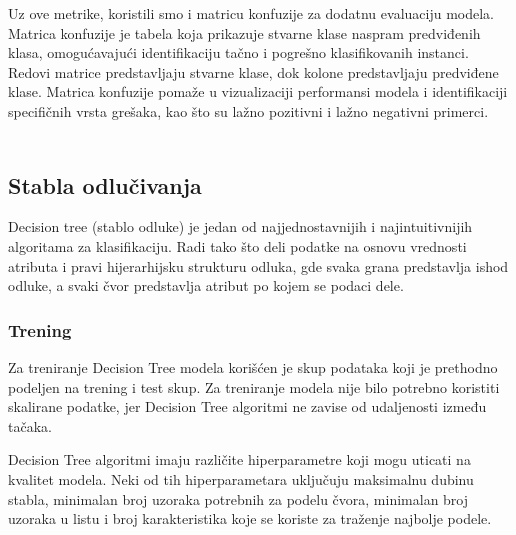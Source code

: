\documentclass[a4paper,12pt]{article}
\begin{document}
Uz ove metrike, koristili smo i matricu konfuzije za dodatnu evaluaciju modela. Matrica konfuzije je tabela koja prikazuje stvarne klase naspram predviđenih klasa, omogućavajući identifikaciju tačno i pogrešno klasifikovanih instanci. Redovi matrice predstavljaju stvarne klase, dok kolone predstavljaju predviđene klase. Matrica konfuzije pomaže u vizualizaciji performansi modela i identifikaciji specifičnih vrsta grešaka, kao što su lažno pozitivni i lažno negativni primerci.\\\\


\subsection{Stabla odlučivanja}
Decision tree (stablo odluke) je jedan od najjednostavnijih i najintuitivnijih algoritama za klasifikaciju. Radi tako što deli podatke na osnovu vrednosti atributa i pravi hijerarhijsku strukturu odluka, gde svaka grana predstavlja ishod odluke, a svaki čvor predstavlja atribut po kojem se podaci dele.


\subsubsection{Trening}

Za treniranje Decision Tree modela korišćen je skup podataka koji je prethodno podeljen na trening i test skup. Za treniranje modela nije bilo potrebno koristiti skalirane podatke, jer Decision Tree algoritmi ne zavise od udaljenosti između tačaka.

Decision Tree algoritmi imaju različite hiperparametre koji mogu uticati na kvalitet modela. Neki od tih hiperparametara uključuju maksimalnu dubinu stabla, minimalan broj uzoraka potrebnih za podelu čvora, minimalan broj uzoraka u listu i broj karakteristika koje se koriste za traženje najbolje podele.
\end{document}
